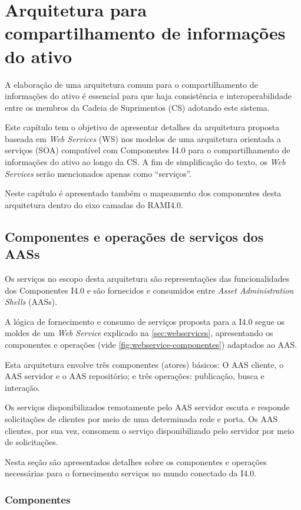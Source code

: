 \chapter{Arquitetura para compartilhamento de informações do ativo}
\label{cha:arquitetura}
	
	A elaboração de uma arquitetura comum para o compartilhamento de informações do ativo é essencial para que haja consistência e interoperabilidade entre os membros da Cadeia de Suprimentos (CS) adotando este sistema.
	
	Este capítulo tem o objetivo de apresentar detalhes da arquitetura proposta baseada em \textit{Web Services} (WS) nos modelos de uma arquitetura orientada a serviços (SOA) compatível com Componentes I4.0 para o compartilhamento de informações do ativo ao longo da CS. A fim de simplificação do texto, os \textit{Web Services} serão mencionados apenas como ``serviços''.
	
	Neste capítulo é apresentado também o mapeamento dos componentes desta arquitetura dentro do eixo camadas do RAMI4.0.
	
\section{Componentes e operações de serviços dos AASs}

	Os serviços no escopo desta arquitetura são representações das funcionalidades dos Componentes I4.0 e são fornecidos e consumidos entre \textit{Asset Administration Shells} (AASs).
	
	A lógica de fornecimento e consumo de serviços proposta para a I4.0 segue os moldes de um \textit{Web Service} explicado na \autoref{sec:webservices}, apresentando os componentes e operações (vide \autoref{fig:webservice-componentes}) adaptados ao AAS.
	
	Esta arquitetura envolve três componentes (atores) básicos: O AAS cliente, o AAS servidor e o AAS repositório; e três operações: publicação, busca e interação.

	Os serviços disponibilizados remotamente pelo AAS servidor escuta e responde solicitações de clientes por meio de uma determinada rede e porta. Os AAS clientes, por sua vez, consomem o serviço disponibilizado pelo servidor por meio de solicitações.
	
	Nesta seção são apresentados detalhes sobre os componentes e operações necessárias para o fornecimento serviços no mundo conectado da I4.0.
	
\subsection{Componentes}

